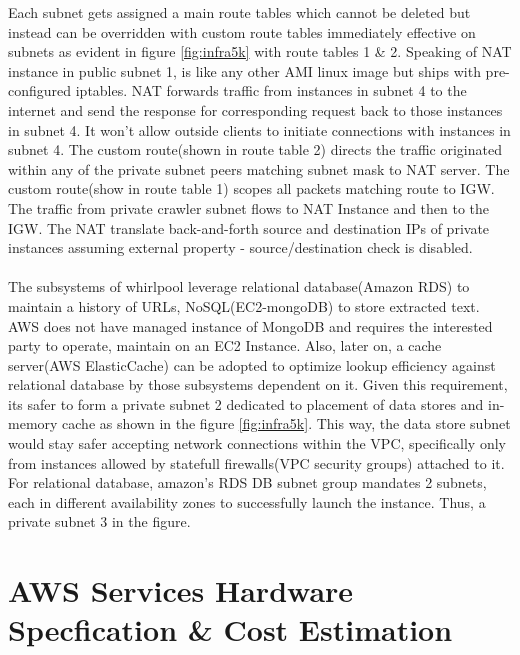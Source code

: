\noindent
Each subnet gets assigned a main route tables which cannot be deleted but instead can be overridden with custom route tables immediately effective on subnets as evident in figure \ref{fig:infra5k} with route tables 1 \& 2. Speaking of NAT instance in public subnet 1, is like any other AMI linux image but ships with pre-configured iptables. NAT forwards traffic from instances in subnet 4 to the internet and send the response for corresponding request back to those instances in subnet 4. It won't allow outside clients to initiate connections with instances in subnet 4. The custom route(shown in route table 2) directs the traffic originated within any of the private subnet peers matching subnet mask  to NAT server. The custom route(show in route table 1) scopes all packets matching  route to IGW. The traffic from private crawler subnet flows to NAT Instance and then to the IGW. The NAT translate back-and-forth source and destination IPs of private instances assuming external property - source/destination check is disabled.
\\
\\
\noindent
The subsystems of whirlpool leverage relational database(Amazon RDS) to maintain a history of URLs, NoSQL(EC2-mongoDB) to store extracted text. AWS does not have managed instance of MongoDB and requires the interested party to operate, maintain on an EC2 Instance. Also, later on, a cache server(AWS ElasticCache) can be adopted to optimize lookup efficiency against relational database by those subsystems dependent on it. Given this requirement, its safer to form a private subnet 2 dedicated to placement of data stores and in-memory cache as shown in the figure \ref{fig:infra5k}. This way, the data store subnet would stay safer accepting network connections within the VPC, specifically only from instances allowed by statefull firewalls(VPC security groups) attached to it. For relational database, amazon's RDS DB subnet group mandates 2 subnets, each in different availability zones to successfully launch the instance. Thus, a private subnet 3 in the figure.

\pagebreak

\section{AWS Services Hardware Specfication \& Cost Estimation}

